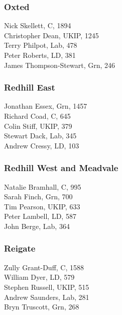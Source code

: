 \documentclass[a4paper,openany,10pt]{book}
\begin{document}
\subsubsection*{Oxted}



Nick Skellett, C, 1894\\
Christopher Dean, UKIP, 1245\\
Terry Philpot, Lab, 478\\
Peter Roberts, LD, 381\\
{James Thompson-Stewart}, Grn, 246\\


\subsubsection*{Redhill East}



Jonathan Essex, Grn, 1457\\
Richard Coad, C, 645\\
Colin Stiff, UKIP, 379\\
Stewart Dack, Lab, 345\\
Andrew Cressy, LD, 103\\


\subsubsection*{Redhill West and Meadvale}



Natalie Bramhall, C, 995\\
Sarah Finch, Grn, 700\\
Tim Pearson, UKIP, 633\\
Peter Lambell, LD, 587\\
John Berge, Lab, 364\\


\subsubsection*{Reigate}



Zully Grant-Duff, C, 1588\\
William Dyer, LD, 579\\
Stephen Russell, UKIP, 515\\
Andrew Saunders, Lab, 281\\
Bryn Truscott, Grn, 268\\
\end{document}
